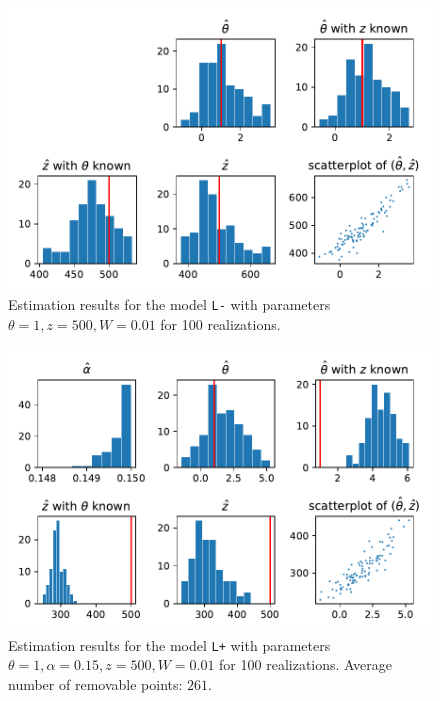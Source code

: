 \begin{figure}
  \centering
    \includegraphics[width=1\textwidth]{"../img/numeric/estimation - type_L-_theta_1"}
  \caption{Estimation results for the model \texttt{L-} with parameters $\theta=1,z=500,W=0.01$ for 100 realizations. }
\end{figure}


\begin{figure}
  \centering
    \includegraphics[width=1\textwidth]{"../img/numeric/estimation - type_L+_theta_1"}
  \caption{Estimation results for the model \texttt{L+} with parameters $\theta=1,\alpha=0.15,z=500,W=0.01$ for 100 realizations. Average number of removable points: $261$.}
\end{figure}
